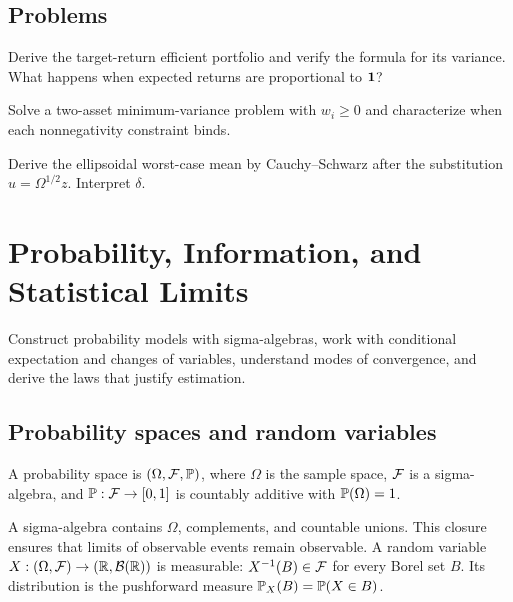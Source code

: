 \section{Problems}

\begin{exercise}
Derive the target-return efficient portfolio and verify the formula for its
variance. What happens when expected returns are proportional to $\bm 1$?
\end{exercise}
\begin{exercise}
Solve a two-asset minimum-variance problem with $w_i\geq0$ and characterize when
each nonnegativity constraint binds.
\end{exercise}
\begin{exercise}
Derive the ellipsoidal worst-case mean by Cauchy--Schwarz after the substitution
$u=\Omega^{1/2}z$. Interpret $\delta$.
\end{exercise}


\chapter{Probability, Information, and Statistical Limits}

\begin{objectives}
Construct probability models with sigma-algebras, work with conditional expectation
and changes of variables, understand modes of convergence, and derive the laws that
justify estimation.
\end{objectives}

\section{Probability spaces and random variables}

\begin{definition}
A probability space is $(\Omega,\mathcal F,\mathbb P)$, where $\Omega$ is the sample space,
$\mathcal F$ is a sigma-algebra, and $\mathbb P:\mathcal F\to[0,1]$ is countably additive with
$\mathbb P(\Omega)=1$.
\end{definition}

A sigma-algebra contains $\Omega$, complements, and countable unions. This closure
ensures that limits of observable events remain observable. A random variable
$X:(\Omega,\mathcal F)\to(\mathbb R,\mathcal B(\mathbb R))$ is measurable: $X^{-1}(B)\in\mathcal F$ for every Borel set
$B$. Its distribution is the pushforward measure
$\mathbb P_X(B)=\mathbb P(X\in B)$.

